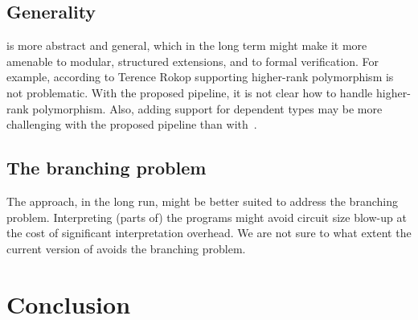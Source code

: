 \documentclass[final]{msc}
\begin{document}
\subsection{Generality}

\Geb{} is more abstract and general, which in the long term might make it
more amenable to modular, structured extensions, and to formal
verification. For example, according to Terence Rokop supporting higher-rank
polymorphism is not problematic. With the proposed pipeline, it is not
clear how to handle higher-rank polymorphism. Also, adding support for
dependent types may be more challenging with the proposed pipeline
than with~\Geb{}.

\subsection{The branching problem}

The \Geb{} approach, in the long run, might be better suited to address the branching problem. Interpreting (parts of) the programs might avoid circuit size blow-up at the cost of significant interpretation overhead. We are not sure to what extent the current version of \Geb{} avoids the branching problem.

\section{Conclusion}\label{sec_conclusion}
\end{document}
